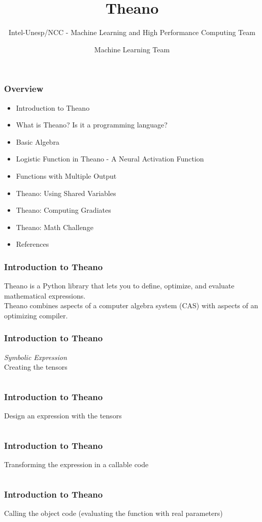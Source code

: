 \documentclass[aspectratio=169]{beamer}
\title[Short title]{Theano}
\subtitle{Intel-Unesp/NCC - Machine Learning and High Performance Computing Team}
\author{Machine Learning Team}
\begin{document}
\begin{frame}
\titlepage 
\end{frame}

\begin{frame}
\frametitle{Overview} 
\begin{itemize}
\item Introduction to Theano
\item What is Theano? Is it a programming language?
\item Basic Algebra
\item Logistic Function in Theano - A Neural Activation Function
\item Functions with Multiple Output
\item Theano: Using Shared Variables
\item Theano: Computing Gradiates
\item Theano: Math Challenge
\item References
\end{itemize}
\end{frame}

\begin{frame}
\frametitle{Introduction to Theano}
Theano is a Python library that lets you to define, optimize, and evaluate mathematical expressions.
\\[1.0cm]
Theano combines aspects of a computer algebra system (CAS) with aspects of an optimizing compiler. 
\end{frame}

\begin{frame}
\frametitle{Introduction to Theano}
\emph{Symbolic Expression}
\\[0.5cm]
Creating the tensors
\inputminted{python}{./aux_files/t1.py}
\end{frame}

\begin{frame}
\frametitle{Introduction to Theano}
Design an expression with the tensors
\inputminted{python}{./aux_files/t2.py}
\end{frame}

\begin{frame}
\frametitle{Introduction to Theano}
Transforming the expression in a callable code
\inputminted{python}{./aux_files/t3.py}
\end{frame}

\begin{frame}
\frametitle{Introduction to Theano}
Calling the object code (evaluating the function with real parameters)
\inputminted{python}{./aux_files/t4.py}
\end{frame}
\end{document}
